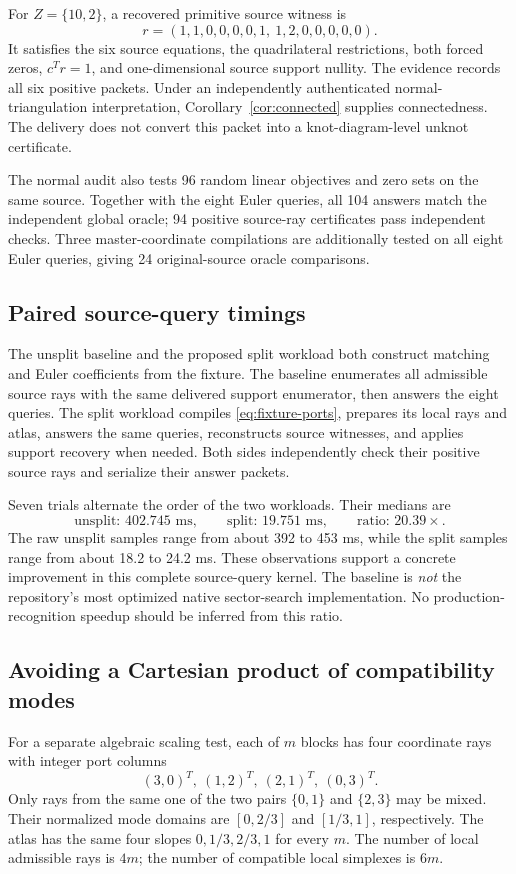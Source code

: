 \documentclass[11pt,a4paper]{article}
\theoremstyle{definition}
\theoremstyle{remark}
\newcommand{\NormalBase}{402.745}
\newcommand{\NormalSplit}{19.751}
\newcommand{\NormalRatio}{20.39}
\begin{document}
For $Z=\{10,2\}$, a recovered primitive source witness is
\[
 r=(1,1,0,0,0,0,1,\ 1,2,0,0,0,0,0).
\]
It satisfies the six source equations, the quadrilateral restrictions, both forced zeros, $c^Tr=1$, and one-dimensional source support nullity. The evidence records all six positive packets. Under an independently authenticated normal-triangulation interpretation, Corollary~\ref{cor:connected} supplies connectedness. The delivery does not convert this packet into a knot-diagram-level unknot certificate.

The normal audit also tests 96 random linear objectives and zero sets on the same source. Together with the eight Euler queries, all 104 answers match the independent global oracle; 94 positive source-ray certificates pass independent checks. Three master-coordinate compilations are additionally tested on all eight Euler queries, giving 24 original-source oracle comparisons.

\subsection{Paired source-query timings}
The unsplit baseline and the proposed split workload both construct matching and Euler coefficients from the fixture. The baseline enumerates all admissible source rays with the same delivered support enumerator, then answers the eight queries. The split workload compiles \eqref{eq:fixture-ports}, prepares its local rays and atlas, answers the same queries, reconstructs source witnesses, and applies support recovery when needed. Both sides independently check their positive source rays and serialize their answer packets.

Seven trials alternate the order of the two workloads. Their medians are
\[
 \text{unsplit: }\NormalBase\text{ ms},\qquad
 \text{split: }\NormalSplit\text{ ms},\qquad
 \text{ratio: }\NormalRatio\times.
\]
The raw unsplit samples range from about 392 to 453 ms, while the split samples range from about 18.2 to 24.2 ms. These observations support a concrete improvement in this complete source-query kernel. The baseline is \emph{not} the repository's most optimized native sector-search implementation. No production-recognition speedup should be inferred from this ratio.

\subsection{Avoiding a Cartesian product of compatibility modes}
For a separate algebraic scaling test, each of $m$ blocks has four coordinate rays with integer port columns
\[
 (3,0)^T,\ (1,2)^T,\ (2,1)^T,\ (0,3)^T.
\]
Only rays from the same one of the two pairs $\{0,1\}$ and $\{2,3\}$ may be mixed. Their normalized mode domains are $[0,2/3]$ and $[1/3,1]$, respectively. The atlas has the same four slopes $0,1/3,2/3,1$ for every $m$. The number of local admissible rays is $4m$; the number of compatible local simplexes is $6m$.
\end{document}
